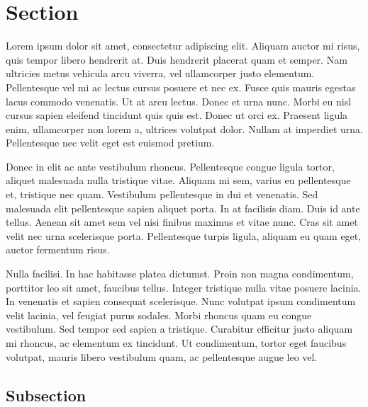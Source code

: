 \documentclass{mathcryptology} %
\begin{document}
\begin{NoHyper}
\articleinformation %
\end{NoHyper}


\section{Section}

Lorem ipsum dolor sit amet, consectetur adipiscing elit. Aliquam auctor mi risus, quis tempor libero hendrerit at. Duis hendrerit placerat quam et semper. Nam ultricies metus vehicula arcu viverra, vel ullamcorper justo elementum. Pellentesque vel mi ac lectus cursus posuere et nec ex. Fusce quis mauris egestas lacus commodo venenatis. Ut at arcu lectus. Donec et urna nunc. Morbi eu nisl cursus sapien eleifend tincidunt quis quis est. Donec ut orci ex. Praesent ligula enim, ullamcorper non lorem a, ultrices volutpat dolor. Nullam at imperdiet urna. Pellentesque nec velit eget est euismod pretium.

Donec in elit ac ante vestibulum rhoncus. Pellentesque congue ligula tortor, aliquet malesuada nulla tristique vitae. Aliquam mi sem, varius eu pellentesque et, tristique nec quam. Vestibulum pellentesque in dui et venenatis. Sed malesuada elit pellentesque sapien aliquet porta. In at facilisis diam. Duis id ante tellus. Aenean sit amet sem vel nisi finibus maximus et vitae nunc. Cras sit amet velit nec urna scelerisque porta. Pellentesque turpis ligula, aliquam eu quam eget, auctor fermentum risus.

Nulla facilisi. In hac habitasse platea dictumst. Proin non magna condimentum, porttitor leo sit amet, faucibus tellus. Integer tristique nulla vitae posuere lacinia. In venenatis et sapien consequat scelerisque. Nunc volutpat ipsum condimentum velit lacinia, vel feugiat purus sodales. Morbi rhoncus quam eu congue vestibulum. Sed tempor sed sapien a tristique. Curabitur efficitur justo aliquam mi rhoncus, ac elementum ex tincidunt. Ut condimentum, tortor eget faucibus volutpat, mauris libero vestibulum quam, ac pellentesque augue leo vel.

\subsection{Subsection}
\end{document}
